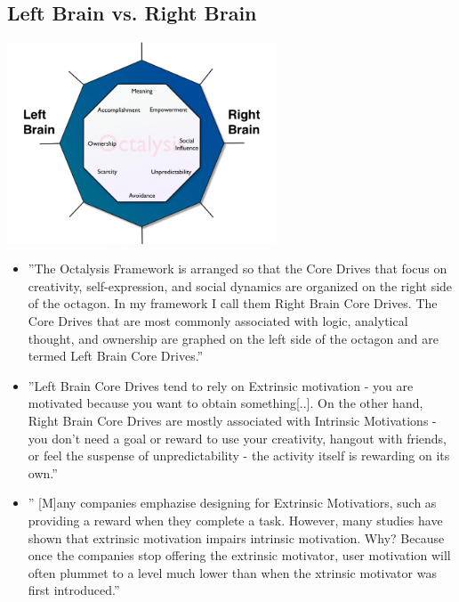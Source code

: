 \subsection{Left Brain vs. Right Brain}
\begin{center}
    \includegraphics[width=0.6\textwidth]{images/left-brain-vs-right-brain-core-drives.png}
\end{center}
\begin{itemize}
    \item ''The Octalysis Framework is arranged so that the Core Drives that focus on creativity, self-expression, and social dynamics are organized on the right side of the octagon. In my framework I call them Right Brain Core Drives. The Core Drives that are most commonly associated with logic, analytical thought, and ownership are graphed on the left side of the octagon and are termed Left Brain Core Drives.''
\item ''Left Brain Core Drives tend to rely on Extrinsic motivation - you are motivated because you want to obtain something[..]. On the other hand, Right Brain Core Drives are mostly associated with Intrinsic Motivations - you don't need a goal or reward to use your creativity, hangout with friends, or feel the suspense of unpredictability - the activity itself is rewarding on its own.''
\item '' [M]any companies emphazise designing for Extrinsic Motivatiors, such as providing a reward when they complete a task. However, many studies have shown that extrinsic motivation impairs intrinsic motivation. Why? Because once the companies stop offering the extrinsic motivator, user motivation will often plummet to a level much lower than when the xtrinsic motivator was first introduced.''
\end{itemize}


